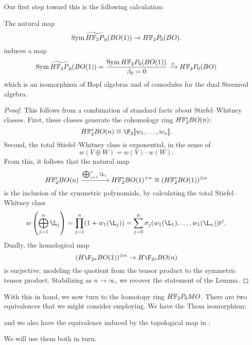 Our first step toward this is the following calculation:
\begin{lemma}\label{HF2BOIsSymAlg}
The natural map \[\Sym \widetilde{\HFtwo P}_0(BO(1)) \to \HFtwo P_0(BO).\] induces a map \[\Sym \widetilde{\HFtwo P}_0(BO(1)) = \frac{\Sym \HFtwo P_0(BO(1))}{\beta_0 = 0} \xrightarrow{\simeq} \HFtwo P_0(BO)\] which is an isomorphism of Hopf algebras and of comodules for the dual Steenrod algebra.
\end{lemma}
\begin{proof}
This follows from a combination of standard facts about Stiefel--Whitney classes.  First, these classes generate the cohomology ring $\HFtwo^* BO(n)$: \[\HFtwo^* BO(n) \cong \F_2\ps{w_1, \ldots, w_n}.\]  Second, the total Stiefel--Whitney class is exponential, in the sense of \[w(V \oplus W) = w(V) \cdot w(W).\]  From this, it follows that the natural map \[\HFtwo^* BO(n) \xrightarrow{\bigoplus_{j=1}^n \L_j} \HFtwo^* BO(1)^{\times n} \cong (\HFtwo^* BO(1))^{\otimes n}\] is the inclusion of the symmetric polynomials, by calculating the total Stiefel--Whitney class \[w\left( \bigoplus_{j=1}^n \L_j \right) = \prod_{j=1}^n (1 + w_1(\L_j)) = \sum_{j=0}^n \sigma_j(w_1(\L_1), \ldots, w_1(\L_n)) t^j.\]  Dually, the homological map \[(H\F_{2*} BO(1))^{\otimes n} \to H\F_{2*} BO(n)\] is surjective, modeling the quotient from the tensor product to the symmetric tensor product.  Stabilizing as $n \to \infty$, we recover the statement of the Lemma.
\end{proof}

With this in hand, we now turn to the homotopy ring $\HFtwo P_0 MO$.  There are two equivalences that we might consider employing.  We have the Thom isomorphism:
\begin{center}
\end{center}
and we also have the equivalence induced by the topological map in :
\begin{center}
\end{center}
We will use them both in turn.

